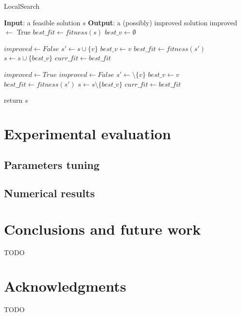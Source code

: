 \documentclass[sigconf]{acmart}
\begin{document}
  
  \begin{algorithm}[!t] 
  	\caption{LocalSearch}\label{alg:ls}
  	\begin{algorithmic}[1]
  		\STATE \textbf{Input}: a feasible solution $s$
  		\STATE \textbf{Output}: a (possibly) improved solution
  		\STATE improved $\gets$ True
  		\STATE $best\_fit \gets fitness(s)$
  		\STATE $best\_v \gets \emptyset$
 
  		     \STATE $improved \gets  False$
  		          \STATE $s' \gets s \cup \{v\}$
  		              \STATE $best\_v \gets v$
  		              \STATE $best\_fit \gets fitness(s')$
  		          \ENDIF
  		     \ENDFOR
  		         \STATE $s \gets s \cup \{best\_v\}$
  		         \STATE $curr\_fit \gets best\_fit$
  		     \ENDIF

  		\ENDWHILE   		    
  		 \STATE  $improved \gets True$
  		   \STATE $improved \gets  False$
  		       \STATE $s' \gets \setminus \{v\}$
  		             \STATE $best\_v \gets v$
  		             \STATE $best\_fit \gets fitness(s')$
  		       \ENDIF
  		       \STATE $s \gets s \setminus \{best\_v\}$
  		       \STATE $curr\_fit \gets best\_fit$
  		       \ENDIF
  		       
  		    \ENDFOR
  		\ENDWHILE
  		\STATE return $s$
  	\end{algorithmic}
\end{algorithm}

\section{Experimental evaluation}


\subsection{Parameters tuning}

\subsection{Numerical results }
 
\section{Conclusions and future work}
 TODO
 
\section*{Acknowledgments} 
TODO



 
\end{document}
